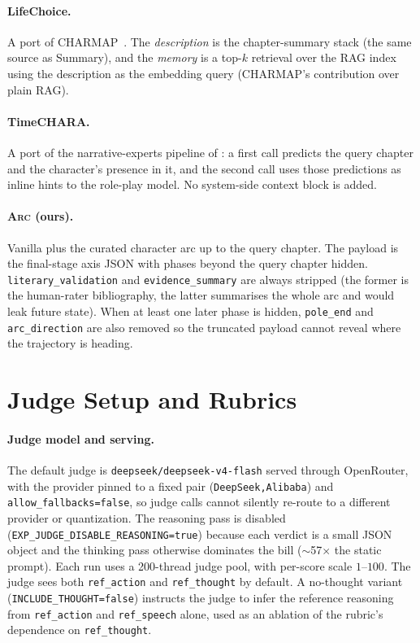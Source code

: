 \documentclass{llmxive}
\begin{document}
\paragraph{LifeChoice.}
A port of CHARMAP~\cite{xu-etal-2025-characterisdestiny}. The \emph{description} is the chapter-summary stack (the same source as Summary), and the \emph{memory} is a top-$k$ retrieval over the RAG index using the description as the embedding query (CHARMAP's contribution over plain RAG).

\paragraph{TimeCHARA.}
A port of the narrative-experts pipeline of \citet{ahn-etal-2024-timechara}: a first call predicts the query chapter and the character's presence in it, and the second call uses those predictions as inline hints to the role-play model. No system-side context block is added.

\paragraph{\textsc{Arc} (ours).}
Vanilla plus the curated character arc up to the query chapter. The payload is the final-stage axis JSON with phases beyond the query chapter hidden. \texttt{literary\_validation} and \texttt{evidence\_summary} are always stripped (the former is the human-rater bibliography, the latter summarises the whole arc and would leak future state). When at least one later phase is hidden, \texttt{pole\_end} and \texttt{arc\_direction} are also removed so the truncated payload cannot reveal where the trajectory is heading.

\section{Judge Setup and Rubrics\label{app:judge}}

\paragraph{Judge model and serving.}
The default judge is \texttt{deepseek/deepseek-v4-flash} served through OpenRouter, with the provider pinned to a fixed pair (\texttt{DeepSeek,Alibaba}) and \texttt{allow\_fallbacks=false}, so judge calls cannot silently re-route to a different provider or quantization. The reasoning pass is disabled (\texttt{EXP\_JUDGE\_DISABLE\_REASONING=true}) because each verdict is a small JSON object and the thinking pass otherwise dominates the bill ($\sim$57$\times$ the static prompt). Each run uses a 200-thread judge pool, with per-score scale $1$--$100$. The judge sees both \texttt{ref\_action} and \texttt{ref\_thought} by default. A no-thought variant (\texttt{INCLUDE\_THOUGHT=false}) instructs the judge to infer the reference reasoning from \texttt{ref\_action} and \texttt{ref\_speech} alone, used as an ablation of the rubric's dependence on \texttt{ref\_thought}.
\end{document}
